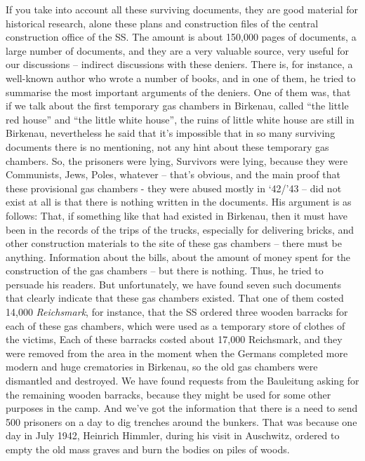If you take into account all these surviving documents, they are good material for historical research, alone these plans and construction files of the central construction office of the SS. The amount is about 150,000 pages of documents, a large number of documents, and they are a very valuable source, very useful for our discussions – indirect discussions with these deniers. There is, for instance, a well-known author who wrote a number of books, and in one of them, he tried to summarise the most important arguments of the deniers. One of them was, that if we talk about the first temporary gas chambers in Birkenau, called ``the little red house'' and ``the little white house'', the ruins of little white house are still in Birkenau, nevertheless he said that it’s impossible that in so many surviving documents there is no mentioning, not any hint about these temporary gas chambers. So, the prisoners were lying, Survivors were lying, because they were Communists, Jews, Poles, whatever – that’s obvious, and the main proof that these provisional gas chambers - they were abused mostly in ‘42/’43 – did not exist at all is that there is nothing written in the documents. His argument is as follows: That, if something like that had existed in Birkenau, then it must have been in the records of the trips of the trucks, especially for delivering bricks, and other construction materials to the site of these gas chambers – there must be anything. Information about the bills, about the amount of money spent for the construction of the gas chambers – but there is nothing. Thus, he tried to persuade his readers. But unfortunately, we have found seven such documents that clearly indicate that these gas chambers existed. That one of them costed 14,000 \textit{Reichsmark}, for instance, that the SS ordered three wooden barracks for each of these gas chambers, which were used as a temporary store of clothes of the victims, Each of these barracks costed about 17,000 Reichsmark, and they were removed from the area in the moment when the Germans completed more modern and huge crematories in Birkenau, so the old gas chambers were dismantled and destroyed. We have found requests from the Bauleitung asking for the remaining wooden barracks, because they might be used for some other purposes in the camp. And we’ve got the information that there is a need to send 500 prisoners on a day to dig trenches around the bunkers. That was because one day in July 1942, Heinrich Himmler, during his visit in Auschwitz, ordered to empty the old mass graves and burn the bodies on piles of woods. 
